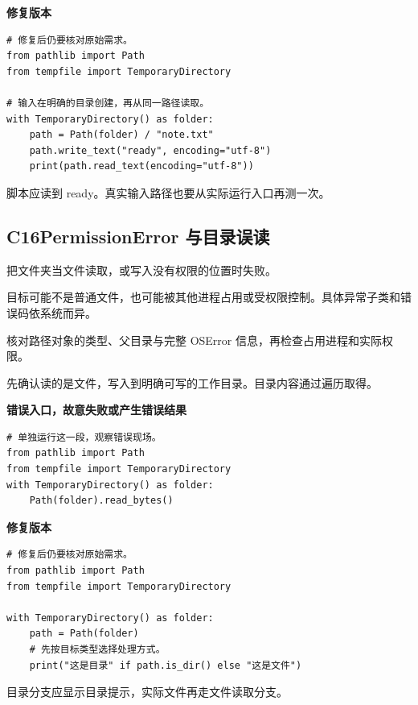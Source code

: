 \documentclass[UTF8,a4paper,oneside,openany,fontset=none,11pt]{ctexbook}
\newcommand{\code}[1]{\texttt{\detokenize{#1}}}
\newcommand{\CaseStep}[2]{\par\smallskip{\bfseries\color{Muted}#1}\enspace #2\par}
\begin{document}
\textbf{修复版本}

\begin{lstlisting}[title={\code{case_15.py}}]
# 修复后仍要核对原始需求。
from pathlib import Path
from tempfile import TemporaryDirectory

# 输入在明确的目录创建，再从同一路径读取。
with TemporaryDirectory() as folder:
    path = Path(folder) / "note.txt"
    path.write_text("ready", encoding="utf-8")
    print(path.read_text(encoding="utf-8"))
\end{lstlisting}

\CaseStep{复验}{脚本应读到 ready。真实输入路径也要从实际运行入口再测一次。}

\subsection*{C16\enspace PermissionError 与目录误读}

\CaseStep{现象}{把文件夹当文件读取，或写入没有权限的位置时失败。}

\CaseStep{原因}{目标可能不是普通文件，也可能被其他进程占用或受权限控制。具体异常子类和错误码依系统而异。}

\CaseStep{排查}{核对路径对象的类型、父目录与完整 OSError 信息，再检查占用进程和实际权限。}

\CaseStep{修复}{先确认读的是文件，写入到明确可写的工作目录。目录内容通过遍历取得。}

\textbf{错误入口，故意失败或产生错误结果}

\begin{lstlisting}[style=errorcode,title={错误复现（故意失败或错误结果）：\code{case_16_bad.py.txt}}]
# 单独运行这一段，观察错误现场。
from pathlib import Path
from tempfile import TemporaryDirectory
with TemporaryDirectory() as folder:
    Path(folder).read_bytes()
\end{lstlisting}

\textbf{修复版本}

\begin{lstlisting}[title={\code{case_16.py}}]
# 修复后仍要核对原始需求。
from pathlib import Path
from tempfile import TemporaryDirectory

with TemporaryDirectory() as folder:
    path = Path(folder)
    # 先按目标类型选择处理方式。
    print("这是目录" if path.is_dir() else "这是文件")
\end{lstlisting}

\CaseStep{复验}{目录分支应显示目录提示，实际文件再走文件读取分支。}
\end{document}
